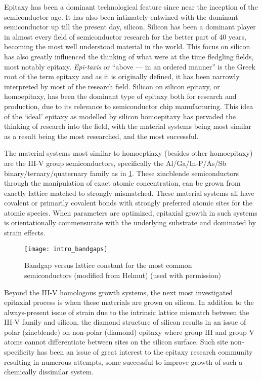 Epitaxy has been a dominant technological feature since near the inception of the semiconductor age.
It has also been intimately entwined with the dominant semiconductor up till the present day, silicon.
Silicon has been a dominant player in almost every field of semiconductor research for the better part of 40 years, becoming the most well understood material in the world.
This focus on silicon has also greatly influenced the thinking of what were at the time fledgling fields, most notably epitaxy.
\emph{Epi-taxis} or ``above --- in an ordered manner'' is the Greek root of the term epitaxy and as it is originally defined, it has been narrowly interpreted by most of the research field.
Silicon on silicon epitaxy, or homoepitaxy, has been the dominant type of epitaxy both for research and production, due to its relevance to semiconductor chip manufacturing.
This idea of the `ideal' epitaxy as modelled by silicon homoepitaxy has pervaded the thinking of research into the field, with the material systems being most similar as a result being the most researched, and the most successful.

The material systems most similar to homoeptiaxy (besides other homoepitaxy) are the III-V group semiconductors, specifically the Al/Ga/In-P/As/Sb bi\-nary/ter\-nary/qua\-ter\-nary family as in \cref{fig:intro_bandgaps}.
These zincblende semiconductors through the manipulation of exact atomic concentration, can be grown from exactly lattice matched to strongly mismatched.
These material systems all have covalent or primarily covalent bonds with strongly preferred atomic sites for the atomic species.
When parameters are optimized, epitaxial growth in such systems is orientationally commensurate with the underlying substrate and dominated by strain effects.
\begin{figure}
 \centering \texttt{[image: intro\_bandgaps]}
 \caption[Bandgap versus lattice constant]{\label{fig:intro_bandgaps}Bandgap versus lattice constant for the most common semiconductors (modified from Helmut\cite{HelmutFoll2013}) (used with permission)}
\end{figure}

Beyond the III-V homologous growth systems, the next most investigated epitaxial process is when these materials are grown on silicon.
In addition to the always-present issue of strain due to the intrinsic lattice mismatch between the III-V family and silicon, the diamond structure of silicon results in an issue of polar (zincblende) on non-polar (diamond) epitaxy\cite{Kroemer1987} where group III and group V atoms cannot differentiate between sites on the silicon surface.
Such site non-specificity has been an issue of great interest to the epitaxy research community resulting in numerous attempts, some successful\cite{Kroemer1987} to improve growth of such a chemically dissimilar system.

